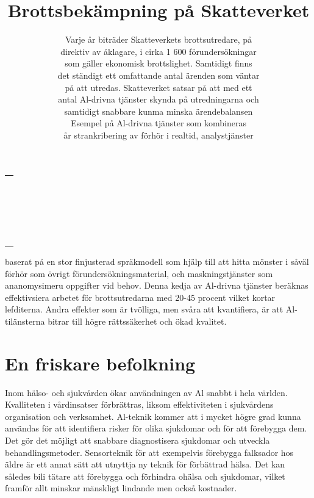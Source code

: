 {{{{{{{{{{{{{{\begin{tabular}{l}
\\
\\
\\
\\
\\
\\
\\
\\
\\
\\
\\ \\
\\
\\
\\
\\
\\
\\
\\
\\
\\
\\ & \\
\end{tabular}

\title{
Brottsbekämpning på Skatteverket
}
\author{
Varje år biträder Skatteverkets brottsutredare, på \\ direktiv av åklagare, i cirka 1 600 förundersökningar \\ som gäller ekonomisk brottslighet. Samtidigt finns \\ det ständigt ett omfattande antal ärenden som väntar \\ på att utredas. Skatteverket satsar på att med ett \\ antal Al-drivna tjänster skynda på utredningarna och \\ samtidigt snabbare kunma minska ärendebalansen \\ Esempel på Al-drivna tjänster som kombineras \\ år strankribering av förhör i realtid, analystjänster
}
baserat på en stor finjusterad spräkmodell som hjälp till att hitta mönster i såväl förhör som övrigt förundersökningsmaterial, och maskningstjänster som ananomysimeru oppgifter vid behov. Denna kedja av Al-drivna tjänster beräknas effektivsiera arbetet för brottsutredarna med 20-45 procent vilket kortar lefditerna. Andra effekter som är tvölliga, men svåra att kvantifiera, är att Al-tilänsterna bitrar till högre rättssäkerhet och ökad kvalitet.
\section*{En friskare befolkning}
Inom hälso- och sjukvården ökar användningen av Al snabbt i hela världen. Kvalliteten i vårdinsatser förbrättras, liksom effektiviteten i sjukvårdens organisation och verksamhet. Al-teknik kommer att i mycket högre grad kunna användas för att identifiera risker för olika sjukdomar och för att förebygga dem. Det gör
det möjligt att snabbare diagnostisera sjukdomar och utveckla behandlingsmetoder. Sensorteknik för att exempelvis förebygga falksador hos äldre är ett annat sätt att utnyttja ny teknik för förbättrad hälsa. Det kan således bili tätare att förebygga och förhindra ohälsa och sjukdomar, vilket framför allt minskar mänskligt lindande men också kostnader.
}}}}}}}}}}}}}}
